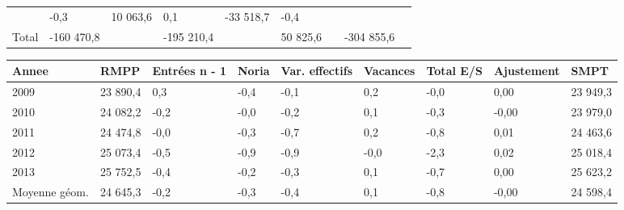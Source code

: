 \begin{longtable}[]{@{}lllllllll@{}}
\begin{minipage}[t]{0.16\columnwidth}
\end{minipage} & \begin{minipage}[t]{0.06\columnwidth}\raggedright
-0,3\strut
\end{minipage} & \begin{minipage}[t]{0.12\columnwidth}\raggedright
10 063,6\strut
\end{minipage} & \begin{minipage}[t]{0.06\columnwidth}\raggedright
0,1\strut
\end{minipage} & \begin{minipage}[t]{0.09\columnwidth}\raggedright
-33 518,7\strut
\end{minipage} & \begin{minipage}[t]{0.06\columnwidth}\raggedright
-0,4\strut
\end{minipage}\tabularnewline
\begin{minipage}[t]{0.05\columnwidth}\raggedright
Total\strut
\end{minipage} & \begin{minipage}[t]{0.10\columnwidth}\raggedright
-160 470,8\strut
\end{minipage} & \begin{minipage}[t]{0.06\columnwidth}\raggedright
\strut
\end{minipage} & \begin{minipage}[t]{0.16\columnwidth}\raggedright
-195 210,4\strut
\end{minipage} & \begin{minipage}[t]{0.06\columnwidth}\raggedright
\strut
\end{minipage} & \begin{minipage}[t]{0.12\columnwidth}\raggedright
50 825,6\strut
\end{minipage} & \begin{minipage}[t]{0.06\columnwidth}\raggedright
\strut
\end{minipage} & \begin{minipage}[t]{0.09\columnwidth}\raggedright
-304 855,6\strut
\end{minipage} & \begin{minipage}[t]{0.06\columnwidth}\raggedright
\strut
\end{minipage}\tabularnewline
\bottomrule
\end{longtable}

\begin{longtable}[]{@{}lllllllll@{}}
\toprule
Annee & RMPP & Entrées n - 1 & Noria & Var. effectifs & Vacances & Total
E/S & Ajustement & SMPT\tabularnewline
\midrule
\endhead
2009 & 23 890,4 & 0,3 & -0,4 & -0,1 & 0,2 & -0,0 & 0,00 & 23
949,3\tabularnewline
2010 & 24 082,2 & -0,2 & -0,0 & -0,2 & 0,1 & -0,3 & -0,00 & 23
979,0\tabularnewline
2011 & 24 474,8 & -0,0 & -0,3 & -0,7 & 0,2 & -0,8 & 0,01 & 24
463,6\tabularnewline
2012 & 25 073,4 & -0,5 & -0,9 & -0,9 & -0,0 & -2,3 & 0,02 & 25
018,4\tabularnewline
2013 & 25 752,5 & -0,4 & -0,2 & -0,3 & 0,1 & -0,7 & 0,00 & 25
623,2\tabularnewline
Moyenne géom. & 24 645,3 & -0,2 & -0,3 & -0,4 & 0,1 & -0,8 & -0,00 & 24
598,4\tabularnewline
\bottomrule
\end{longtable}

